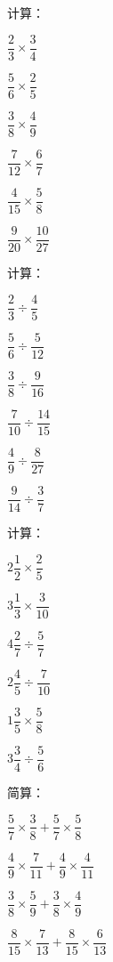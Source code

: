 \documentclass[a4paper,12pt]{ctexart}
\begin{document}
\begin{exercise}
\item 计算：
  \begin{subexercise}
    \item $\dfrac{2}{3}\times\dfrac{3}{4}$
    \item $\dfrac{5}{6}\times\dfrac{2}{5}$
    \item $\dfrac{3}{8}\times\dfrac{4}{9}$
    \item $\dfrac{7}{12}\times\dfrac{6}{7}$
    \item $\dfrac{4}{15}\times\dfrac{5}{8}$
    \item $\dfrac{9}{20}\times\dfrac{10}{27}$
  \end{subexercise}

\item 计算：
  \begin{subexercise}
    \item $\dfrac{2}{3}\div\dfrac{4}{5}$
    \item $\dfrac{5}{6}\div\dfrac{5}{12}$
    \item $\dfrac{3}{8}\div\dfrac{9}{16}$
    \item $\dfrac{7}{10}\div\dfrac{14}{15}$
    \item $\dfrac{4}{9}\div\dfrac{8}{27}$
    \item $\dfrac{9}{14}\div\dfrac{3}{7}$
  \end{subexercise}

\item 计算：
  \begin{subexercise}
    \item $2\dfrac{1}{2}\times\dfrac{2}{5}$
    \item $3\dfrac{1}{3}\times\dfrac{3}{10}$
    \item $4\dfrac{2}{7}\div\dfrac{5}{7}$
    \item $2\dfrac{4}{5}\div\dfrac{7}{10}$
    \item $1\dfrac{3}{5}\times\dfrac{5}{8}$
    \item $3\dfrac{3}{4}\div\dfrac{5}{6}$
  \end{subexercise}

\item 简算：
  \begin{subexercise}
    \item $\dfrac{5}{7}\times\dfrac{3}{8}+\dfrac{5}{7}\times\dfrac{5}{8}$
    \item $\dfrac{4}{9}\times\dfrac{7}{11}+\dfrac{4}{9}\times\dfrac{4}{11}$
    \item $\dfrac{3}{8}\times\dfrac{5}{9}+\dfrac{3}{8}\times\dfrac{4}{9}$
    \item $\dfrac{8}{15}\times\dfrac{7}{13}+\dfrac{8}{15}\times\dfrac{6}{13}$
  \end{subexercise}


\end{exercise}
\end{document}
